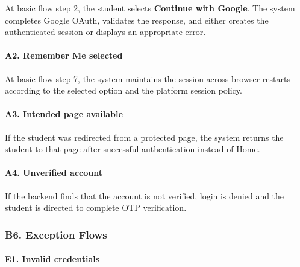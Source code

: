 \documentclass[12pt]{article}
\begin{document}
At basic flow step 2, the student selects \textbf{Continue with Google}. The system completes Google OAuth, validates the response, and either creates the authenticated session or displays an appropriate error.
\par\medskip

\hypertarget{sec:a2-remember-me-selected}{}
\paragraph*{A2. Remember Me selected}
\par\medskip

At basic flow step 7, the system maintains the session across browser restarts according to the selected option and the platform session policy.
\par\medskip

\hypertarget{sec:a3-intended-page-available}{}
\paragraph*{A3. Intended page available}
\par\medskip

If the student was redirected from a protected page, the system returns the student to that page after successful authentication instead of Home.
\par\medskip

\hypertarget{sec:a4-unverified-account}{}
\paragraph*{A4. Unverified account}
\par\medskip

If the backend finds that the account is not verified, login is denied and the student is directed to complete OTP verification.
\par\medskip

\hypertarget{sec:b6-exception-flows}{}
\subsubsection*{B6. Exception Flows}
\par\medskip

\hypertarget{sec:e1-invalid-credentials}{}
\paragraph*{E1. Invalid credentials}
\par\medskip
\end{document}
